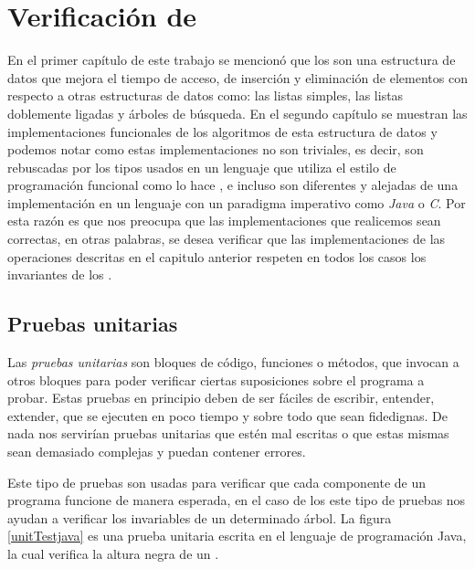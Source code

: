 \chapter{Verificación de {\arns}}

En el primer cap\'itulo de este trabajo se mencion\'o que los {\arns} son una estructura de datos
que mejora el tiempo de acceso, de inserción y eliminación de elementos con respecto a otras
estructuras de datos como: las listas simples, las listas doblemente ligadas y \'arboles de
búsqueda. En el segundo cap\'itulo se muestran las implementaciones funcionales de los algoritmos de esta
estructura de datos y podemos notar como estas implementaciones no son triviales, es decir, son
rebuscadas por los tipos usados en un lenguaje que utiliza el estilo de programaci\'on funcional como
lo hace {\coq}, e incluso son diferentes y alejadas de una implementaci\'on en un lenguaje con un paradigma imperativo como \textit{Java} o \textit{C}.
Por esta razón es que nos preocupa que las implementaciones que realicemos sean correctas, en otras palabras, se desea verificar que las implementaciones de las operaciones
descritas en el capitulo anterior respeten en todos los casos los invariantes de los {\arns}.

\section{Pruebas unitarias}
Las \textit{pruebas unitarias} \cite{unittest} son bloques de c\'odigo, funciones o m\'etodos, que
invocan a otros bloques para poder verificar ciertas suposiciones sobre el programa a probar. Estas
pruebas en principio deben de ser fáciles de escribir, entender, extender, que se ejecuten en poco
tiempo y sobre todo que sean fidedignas. De nada nos servirían pruebas unitarias que estén mal
escritas o que estas mismas sean demasiado complejas y puedan contener errores.

Este tipo de pruebas son usadas para verificar que cada componente de un programa funcione de
manera esperada, en el caso de los {\arns} este tipo de pruebas nos ayudan a verificar los
invariables de un determinado \'arbol. La figura \ref{unitTestjava} es una prueba unitaria
escrita en el lenguaje de programaci\'on Java, la cual verifica la altura negra de un {\arn} \cite{CanekPU}.

